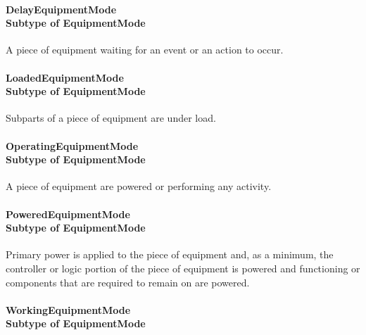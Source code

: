 \paragraph[DelayEquipmentMode]{DelayEquipmentMode \\ {\small Subtype of EquipmentMode}}\mbox{}
  \label{type:DelayEquipmentMode}

\FloatBarrier

A piece of equipment waiting for an event or an action to occur.

\paragraph[LoadedEquipmentMode]{LoadedEquipmentMode \\ {\small Subtype of EquipmentMode}}\mbox{}
  \label{type:LoadedEquipmentMode}

\FloatBarrier

Subparts of a piece of equipment are under load.

\paragraph[OperatingEquipmentMode]{OperatingEquipmentMode \\ {\small Subtype of EquipmentMode}}\mbox{}
  \label{type:OperatingEquipmentMode}

\FloatBarrier

A piece of equipment are powered or performing any activity.

\paragraph[PoweredEquipmentMode]{PoweredEquipmentMode \\ {\small Subtype of EquipmentMode}}\mbox{}
  \label{type:PoweredEquipmentMode}

\FloatBarrier

Primary  power is  applied  to the  piece  of  equipment and,  as  a minimum, the controller or logic portion of the piece of equipment is powered and functioning or components that are required to remain on are powered.

\paragraph[WorkingEquipmentMode]{WorkingEquipmentMode \\ {\small Subtype of EquipmentMode}}\mbox{}
  \label{type:WorkingEquipmentMode}


